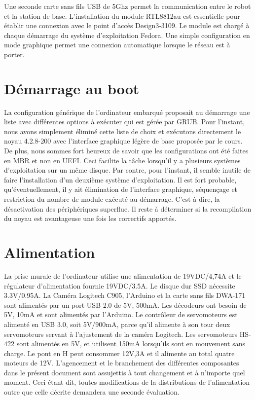  Une seconde carte sans fils USB de 5Ghz permet la communication entre le robot et la station de base. L’installation du module RTL8812au est essentielle pour établir une connexion avec le point d’accès Design3-3109. Le module est chargé à chaque démarrage du système d’exploitation Fedora. Une simple configuration en mode graphique permet une connexion automatique lorsque le réseau est à porter. 
 
\section{Démarrage au boot}
La configuration générique de l’ordinateur embarqué proposait au démarrage une liste avec différentes options à exécuter qui est gérée par GRUB. Pour l’instant, nous avons simplement éliminé cette liste de choix et exécutons directement le noyau 4.2.8-200 avec l’interface graphique légère de base proposée par le cours. De plus, nous sommes fort heureux de savoir que les configurations ont été faites en MBR et non en UEFI. Ceci facilite la tâche lorsqu’il y a plusieurs systèmes d’exploitation sur un même disque. Par contre, pour l’instant, il semble inutile de faire l’installation d’un deuxième système d’exploitation. Il est fort probable, qu’éventuellement, il y ait élimination de l’interface graphique, séquençage et restriction du nombre de module exécuté au démarrage. C’est-à-dire, la désactivation des périphériques superflue. Il reste à déterminer si la recompilation du noyau est avantageuse une fois les correctifs apportés.  

\section{Alimentation}
  La prise murale de l'ordinateur utilise une alimentation de 19VDC/4,74A et le régulateur d’alimentation fournie 19VDC/3.5A. Le disque dur SSD nécessite 3.3V/0.95A. La Caméra Logitech C905, l’Arduino et la carte sans fils DWA-171 sont alimentés par un port USB 2.0 de 5V, 500mA. Les décodeurs ont besoin de 5V, 10mA et sont alimentés par l’Arduino. Le contrôleur de servomoteurs est alimenté en USB 3.0, soit 5V/900mA, parce qu'il alimente à son tour deux servomoteurs servant à l'ajustement de la caméra Logitech. Les servomoteurs HS-422 sont alimentés en 5V, et utilisent 150mA lorsqu’ils sont en mouvement sans charge. Le pont en H peut consommer 12V,3A et il alimente au total quatre moteurs de 12V. L'agencement et le branchement des différentes composantes dans le présent document sont assujettis à tout changement et à n'importe quel moment. Ceci étant dit, toutes modifications de la distributions de l'alimentation outre que celle décrite demandera une seconde évaluation.  

